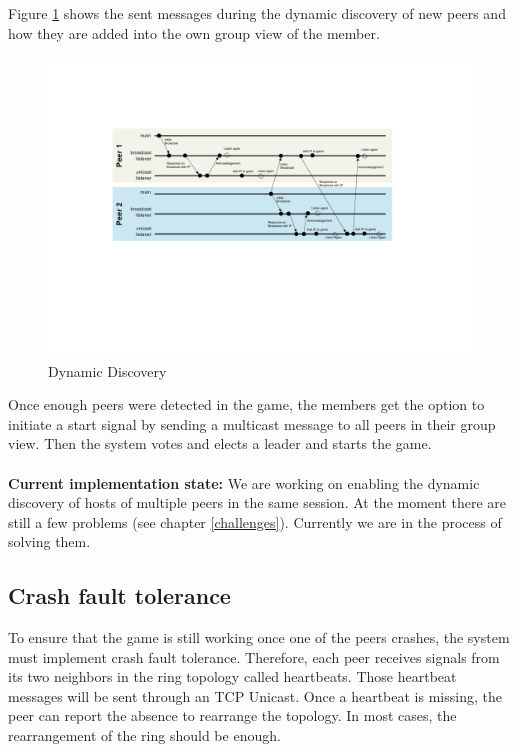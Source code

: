 \documentclass[runningheads]{llncs}
\begin{document}
        Figure \ref{fig:dynamic_discovery} shows the sent messages during the dynamic discovery of new peers and how they are added into the own group view of the member.
    
        \begin{figure}[h]
            \includegraphics[width=\textwidth]{dynamic_dicovery.pdf}
            \caption{Dynamic Discovery} \label{fig:dynamic_discovery}
        \end{figure}
        
        Once enough peers were detected in the game, the members get the option to initiate a start signal by sending a multicast message to all peers in their group view. Then the system votes and elects a leader and starts the game.
        \\\\
        \textbf{Current implementation state:} We are working on enabling the dynamic discovery of hosts of multiple peers in the same session. At the moment there are still a few problems (see chapter \ref{challenges}). Currently we are in the process of solving them.
        
    \subsection{Crash fault tolerance}
        To ensure that the game is still working once one of the peers crashes, the system must implement crash fault tolerance. Therefore, each peer receives signals from its two neighbors in the ring topology called heartbeats. Those heartbeat messages will be sent through an TCP Unicast. Once a heartbeat is missing, the peer can report the absence to rearrange the topology. In most cases, the rearrangement of the ring should be enough.
        
\end{document}
